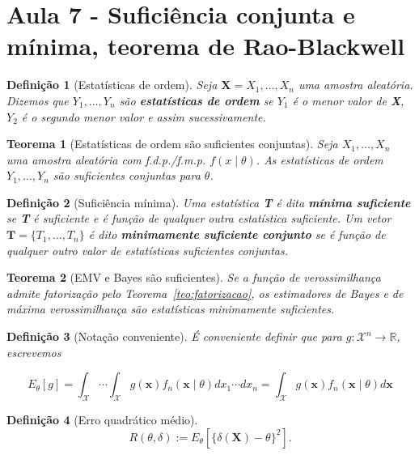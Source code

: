 \documentclass{article}
\newtheorem{theorem}{Teorema}
\newtheorem{definition}{Definição}
\begin{document}
\section*{Aula 7 - Suficiência conjunta e mínima, teorema de Rao-Blackwell}

\begin{definition}[Estatísticas de ordem]
Seja $\textbf{X} = X_1, \ldots, X_n$ uma amostra aleatória. Dizemos que $Y_1, \ldots, Y_n$ são \textbf{estatísticas de ordem} se $Y_1$ é o menor valor de \textbf{X}, $Y_2$ é o segundo menor valor e assim sucessivamente.
\end{definition}

\begin{theorem}[Estatísticas de ordem são suficientes conjuntas]
Seja $X_1, \ldots, X_n$ uma amostra aleatória com f.d.p./f.m.p. $f(x \mid \theta)$. As estatísticas de ordem $Y_1, \ldots, Y_n$ são suficientes conjuntas para $\theta$.
\end{theorem}

\begin{definition}[Suficiência mínima]
Uma estatística \textbf{T} é dita \textbf{mínima suficiente} se \textbf{T} é suficiente e é função de qualquer outra estatística suficiente. Um vetor $\textbf{T} = \{ T_1, \ldots, T_n \}$ é dito \textbf{minimamente suficiente conjunto} se é função de qualquer outro valor de estatísticas suficientes conjuntas.
\end{definition}

\begin{theorem}[EMV e Bayes são suficientes]
Se a função de verossimilhança admite fatorização pelo Teorema~\ref{teo:fatorizacao}, os estimadores de Bayes e de máxima verossimilhança são estatísticas minimamente suficientes.
\end{theorem}

\begin{definition}[Notação conveniente]
É conveniente definir que para $g : \mathcal{X}^n \rightarrow \mathbb{R}$, escrevemos

\begin{equation}
    E_\theta [g] = \int_\mathcal{X} \cdots \int_\mathcal{X} g(\textbf{x}) f_n (\textbf{x} \mid \theta) d x_1 \cdots d x_n = \int_\mathcal{X} g(\textbf{x}) f_n (\textbf{x} \mid \theta) d \textbf{x} 
\end{equation}
\end{definition}

\begin{definition}[Erro quadrático médio]
\begin{equation}
    R(\theta, \delta) := E_\theta \left [ \{ \delta(\textbf{X}) - \theta \}^2 \right ].
\end{equation}
\end{definition}
\end{document}
